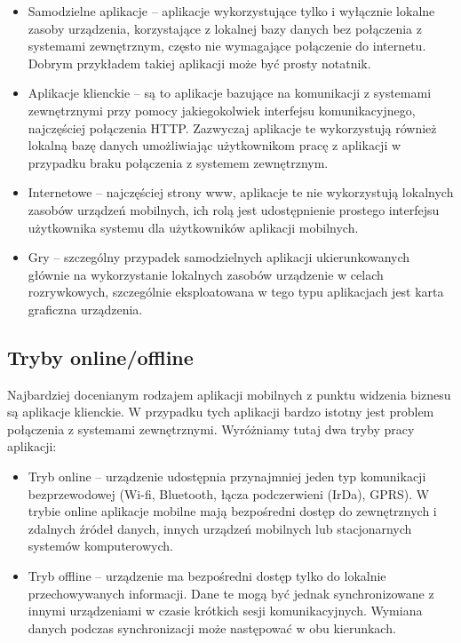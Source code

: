 \begin{itemize}
\item Samodzielne aplikacje -- aplikacje wykorzystujące tylko i wyłącznie lokalne zasoby urządzenia, korzystające z lokalnej bazy danych bez połączenia z systemami zewnętrznym, często nie wymagające połączenie do internetu. Dobrym przykładem takiej aplikacji może być prosty notatnik.  
\item Aplikacje klienckie -- są to aplikacje bazujące na komunikacji z systemami zewnętrznymi przy pomocy jakiegokolwiek interfejsu komunikacyjnego,  najczęściej połączenia HTTP. Zazwyczaj aplikacje te wykorzystują również lokalną bazę danych umożliwiając użytkownikom pracę z aplikacji w przypadku braku połączenia z systemem zewnętrznym.
\item Internetowe -- najczęściej strony www, aplikacje  te nie wykorzystują lokalnych zasobów urządzeń mobilnych, ich rolą jest udostępnienie prostego interfejsu użytkownika systemu dla użytkowników aplikacji mobilnych.
\item Gry  -- szczególny przypadek samodzielnych aplikacji ukierunkowanych głównie na wykorzystanie lokalnych zasobów urządzenie w celach rozrywkowych, szczególnie eksploatowana w tego typu aplikacjach jest karta graficzna urządzenia.
\end{itemize}

\subsection{Tryby online/offline}
\label{sec:trybyAplikacjiMobilnych}

Najbardziej docenianym rodzajem aplikacji mobilnych z punktu widzenia biznesu są aplikacje klienckie. W przypadku tych aplikacji bardzo istotny jest problem połączenia z systemami zewnętrznymi. Wyróżniamy tutaj dwa tryby pracy aplikacji:

\begin{itemize}
\item Tryb online -- urządzenie udostępnia przynajmniej jeden typ komunikacji bezprzewodowej (Wi-fi, Bluetooth, łącza podczerwieni (IrDa), GPRS). W trybie online aplikacje mobilne mają bezpośredni dostęp do zewnętrznych i zdalnych źródeł danych, innych urządzeń mobilnych lub stacjonarnych systemów komputerowych.   
\item Tryb offline -- urządzenie ma bezpośredni dostęp tylko do lokalnie przechowywanych informacji. Dane te mogą być jednak synchronizowane z innymi urządzeniami w czasie krótkich sesji komunikacyjnych. Wymiana danych podczas synchronizacji może następować w obu kierunkach. 
\end{itemize}

